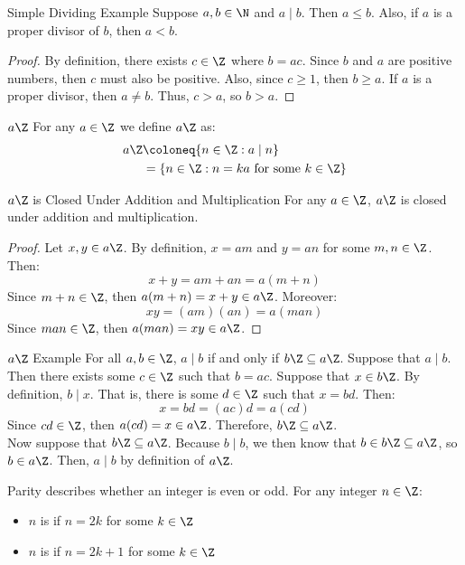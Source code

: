 \documentclass[letterpaper,12pt]{report}
\begin{document}
\begin{exbox}{Simple Dividing Example}{}
	Suppose $a,b \in \N$ and $a \mid b$. Then $a \leq b$. Also, if $a$ is a proper divisor of $b$, then $a<b$.
	\tcblower
	\begin{proof}
		By definition, there exists $c \in \Z$ where $b=ac$. Since $b$ and $a$ are positive numbers, then $c$ must also be positive. Also, since $c \geq 1$, then $b \geq a$. If $a$ is a proper divisor, then $a \neq b$. Thus, $c>a$, so $b>a$.
	\end{proof}
\end{exbox}

\begin{dfnbox}{$a \Z$}{}
	For any $a \in \Z$ we define $a\Z$ as:
	\begin{align*}
		a \Z & \coloneq \{ n \in \Z : a \mid n \} \\
		&= \{ n \in \Z : n = ka\ \text{for some}\ k \in \Z \}
	\end{align*}
\end{dfnbox}

\begin{thmbox}{$a\Z$ is Closed Under Addition and Multiplication}{}
	For any $a \in \Z$, $a \Z$ is closed under addition and multiplication.
	\tcblower
	\begin{proof}
		Let $x,y \in a \Z$. By definition, $x = am$ and $y = an$ for some $m, n \in \Z$. Then:
		$$x+y = am+an = a(m+n)$$
		Since $m+n \in \Z$, then $a(m+n) = x+y \in a \Z$. Moreover:
		$$xy = (am)(an) = a(man)$$
		Since $man \in \Z$, then $a(man) = xy \in a\Z$.
	\end{proof}
\end{thmbox}

\begin{exbox}{$a\Z$ Example}{}
	For all $a,b \in \Z$, $a \mid b$ if and only if $b\Z \subseteq a\Z$.
	\tcblower
	Suppose that $a \mid b$. Then there exists some $c \in \Z$ such that $b = ac$. Suppose that $x \in b \Z$. By definition, $b \mid x$. That is, there is some $d \in \Z$ such that $x = bd$. Then:
	$$x = bd = (ac)d = a(cd)$$
	Since $cd \in \Z$, then $a(cd) = x \in a\Z$. Therefore, $b\Z \subseteq a\Z$.\\

	Now suppose that $b\Z \subseteq a \Z$. Because $b \mid b$, we then know that $b \in b\Z \subseteq a \Z$, so $b \in a\Z$. Then, $a \mid b$ by definition of $a \Z$.
\end{exbox}

\begin{dfnbox}{Parity}{}
	 describes whether an integer is even or odd. For any integer $n \in \Z$:
	\begin{itemize}
		\item $n$ is  if $n = 2k$ for some $k \in \Z$
		\item $n$ is  if $n = 2k+1$ for some $k \in \Z$
	\end{itemize}
\end{dfnbox}
\end{document}
